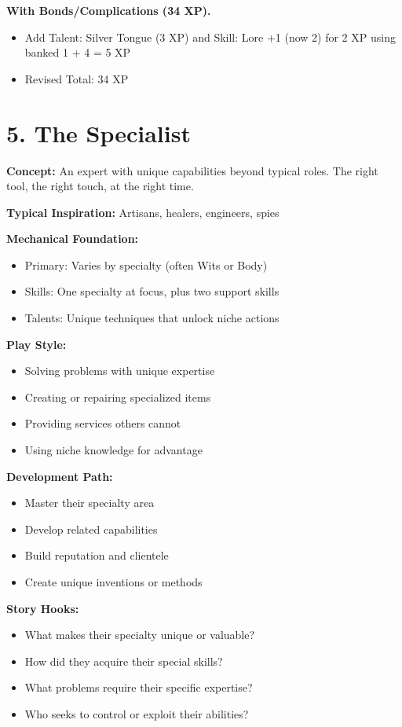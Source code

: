 \documentclass[11pt,twoside,openany]{book}
\begin{document}
\textbf{With Bonds/Complications (34 XP).}
\begin{itemize}
\item Add Talent: Silver Tongue (3 XP) and Skill: Lore +1 (now 2) for 2 XP using banked 1 + 4 = 5 XP
\item Revised Total: 34 XP
\end{itemize}

\section*{5. The Specialist} 

\textbf{Concept:} An expert with unique capabilities beyond typical roles. The right tool, the right touch, at the right time.

\textbf{Typical Inspiration:} Artisans, healers, engineers, spies

\textbf{Mechanical Foundation:}
\begin{itemize}
\item Primary: Varies by specialty (often Wits or Body)
\item Skills: One specialty at focus, plus two support skills
\item Talents: Unique techniques that unlock niche actions
\end{itemize}

\textbf{Play Style:}
\begin{itemize}
\item Solving problems with unique expertise
\item Creating or repairing specialized items
\item Providing services others cannot
\item Using niche knowledge for advantage
\end{itemize}

\textbf{Development Path:}
\begin{itemize}
\item Master their specialty area
\item Develop related capabilities
\item Build reputation and clientele
\item Create unique inventions or methods
\end{itemize}

\textbf{Story Hooks:}
\begin{itemize}
\item What makes their specialty unique or valuable?
\item How did they acquire their special skills?
\item What problems require their specific expertise?
\item Who seeks to control or exploit their abilities?
\end{itemize}
\end{document}
